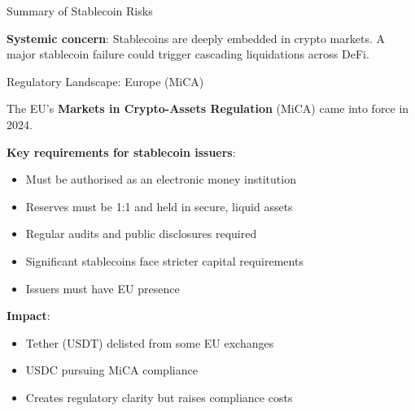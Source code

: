 \documentclass[10pt]{beamer}
\newcommand{\highlight}[1]{\textcolor{AccentOrange}{\textbf{#1}}}
\begin{document}
\begin{frame}{Summary of Stablecoin Risks}
  \begin{center}
  \end{center}
  
  \vspace{1em}
  \textbf{Systemic concern}: Stablecoins are deeply embedded in crypto markets. A major stablecoin failure could trigger cascading liquidations across DeFi.
\end{frame}

\begin{frame}{Regulatory Landscape: Europe (MiCA)}
  
  The EU's \highlight{Markets in Crypto-Assets Regulation} (MiCA) came into force in 2024.
  
  \vspace{1em}
  \textbf{Key requirements for stablecoin issuers}:
  \begin{itemize}
    \item Must be authorised as an electronic money institution
    \item Reserves must be 1:1 and held in secure, liquid assets
    \item Regular audits and public disclosures required
    \item Significant stablecoins face stricter capital requirements
    \item Issuers must have EU presence
  \end{itemize}
  
  \vspace{1em}
  \textbf{Impact}:
  \begin{itemize}
    \item Tether (USDT) delisted from some EU exchanges
    \item USDC pursuing MiCA compliance
    \item Creates regulatory clarity but raises compliance costs
  \end{itemize}
\end{frame}
\end{document}
